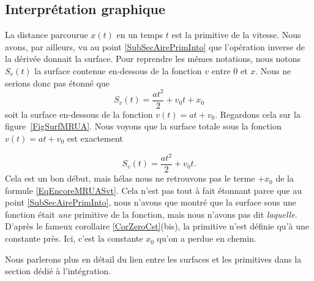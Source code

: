 					\subsection{Interprétation graphique}

La distance parcourue $x(t)$ en un temps $t$ est la primitive de la vitesse. Nous avons, par ailleurs, vu au point \ref{SubSecAirePrimInto} que l'opération inverse de la dérivée donnait la surface. Pour reprendre les mêmes notations, nous notons $S_v(t)$ la surface contenue en-dessous de la fonction $v$ entre $0$ et $x$. Nous ne serions donc pas étonné que
\begin{equation}		\label{EqEncoreMRUASvt}
	S_v(t) = \frac{ at^2 }{ 2 }+v_0t+x_0
\end{equation}
soit la surface en-dessous de la fonction $v(t)=at+v_0$. Regardons cela sur la figure~\ref{FigSurfMRUA}. Nous voyons que la surface totale sous la fonction $v(t)=at+v_0$ est exactement
\newcommand{\CaptionSurfMRUA}{La surface bleue est un triangle de base $t$ et de hauteur $at$, tandis que le rectangle rouge est de base $t$ et de hauteur $v_0$.}

\begin{equation}
	S_v(t)=\frac{ at^2 }{ 2 }+v_0t.
\end{equation}
Cela est un bon début, mais hélas nous ne retrouvons pas le terme \og $+x_0$\fg{} de la formule \eqref{EqEncoreMRUASvt}. Cela n'est pas tout à fait étonnant parce que au point \ref{SubSecAirePrimInto}, nous n'avons que montré que la surface sous une fonction était \emph{une} primitive de la fonction, mais nous n'avons pas dit \emph{laquelle}. D'après le fameux corollaire \ref{CorZeroCst}(bis), la primitive n'est définie qu'à une constante près. Ici, c'est la constante $x_0$ qu'on a perdue en chemin.

Nous parlerons plus en détail du lien entre les surfaces et les primitives dans la section dédié à l'intégration.


\label{LaFin}
